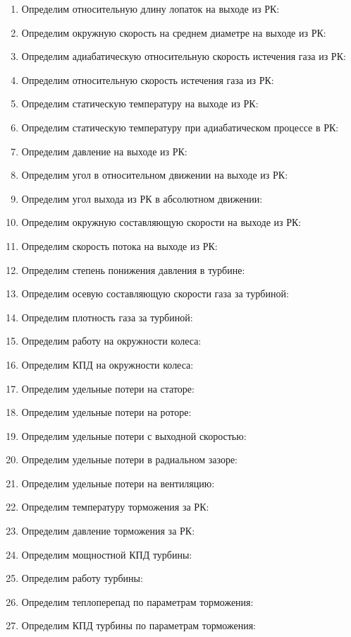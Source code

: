 \begin{enumerate}
	 \item Определим относительную длину лопаток на выходе из РК:
	 \item Определим окружную скорость на среднем диаметре на выходе из РК:
	 \item Определим адиабатическую относительную скорость истечения газа из РК:
	 \item Определим относительную скорость истечения газа из РК:
	 \item Определим статическую температуру на выходе из РК:
	 \item Определим статическую температуру при адиабатическом процессе в РК:
	 \item Определим давление на выходе из РК:
	 \item Определим угол в относительном движении на выходе из РК:
	 \item Определим угол выхода из РК в абсолютном движении:
	 \item Определим окружную составляющую скорости на выходе из РК:
	 \item Определим скорость потока на выходе из РК:
	 \item Определим степень понижения давления в турбине:
	 \item Определим осевую составляющую скорости газа за турбиной:
	 \item Определим плотность газа за турбиной:
	 \item Определим работу на окружности колеса:
	 \item Определим КПД на окружности колеса:
	 \item Определим удельные потери на статоре:
	 \item Определим удельные потери на роторе:
	 \item Определим удельные потери с выходной скоростью:
	 \item Определим удельные потери в радиальном зазоре:
	 \item Определим удельные потери на вентиляцию:
	 \item Определим температуру торможения за РК:
	 \item Определим давление торможения за РК:
	 \item Определим мощностной КПД турбины:
	 \item Определим работу турбины:
	 \item Определим теплоперепад по параметрам торможения:
	 \item Определим КПД турбины по параметрам торможения:
\end{enumerate}